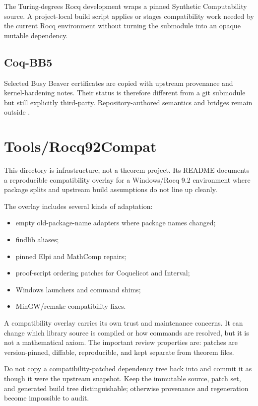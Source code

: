 \documentclass[
  10pt,
  a4paper,
  twoside,
  open=any,
  parskip=half,
  headings=big
]{scrreprt}
\newcommand{\code}[1]{\texttt{\detokenize{#1}}}
\begin{document}
The Turing-degrees Rocq development wraps a pinned Synthetic Computability
source.  A project-local build script applies or stages compatibility work
needed by the current Rocq environment without turning the submodule into an
opaque mutable dependency.

\subsection{Coq-BB5}

Selected Busy Beaver certificates are copied with upstream provenance and
kernel-hardening notes.  Their status is therefore different from a git
submodule but still explicitly third-party.  Repository-authored semantics and
bridges remain outside \code{lib}.

\section{Tools/Rocq92Compat}
\label{sec:rocq-compat}

This directory is infrastructure, not a theorem project.  Its README documents
a reproducible compatibility overlay for a Windows/Rocq 9.2 environment where
package splits and upstream build assumptions do not line up cleanly.

The overlay includes several kinds of adaptation:

\begin{itemize}
  \item empty old-package-name adapters where package names changed;
  \item findlib aliases;
  \item pinned Elpi and MathComp repairs;
  \item proof-script ordering patches for Coquelicot and Interval;
  \item Windows launchers and command shims;
  \item MinGW/remake compatibility fixes.
\end{itemize}

A compatibility overlay carries its own trust and maintenance concerns.  It
can change which library source is compiled or how commands are resolved, but
it is not a mathematical axiom.  The important review properties are:
patches are version-pinned, diffable, reproducible, and kept separate from
theorem files.

\begin{gotchabox}
Do not copy a compatibility-patched dependency tree back into \code{lib} and
commit it as though it were the upstream snapshot.  Keep the immutable source,
patch set, and generated build tree distinguishable; otherwise provenance and
regeneration become impossible to audit.
\end{gotchabox}
\end{document}
